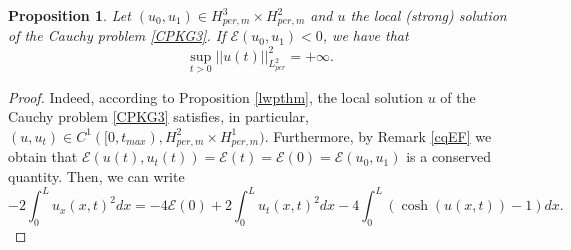 \documentclass[12pt,reqno,a4paper]{amsart} %
\numberwithin{equation}{section}
\numberwithin{figure}{section}
\newtheorem{proposition}[theorem]{Proposition}
\begin{document}
\begin{proposition}\label{bw}
Let $(u_0,u_1)\in H_{per,m}^3\times H_{per,m}^2$ and $u$ the local (strong) solution of the Cauchy problem \eqref{CPKG3}. If $\mathcal{E}(u_0,u_1)<0$, we have that $$\sup_{t>0}||u(t)||_{L_{per}^2}^2=+\infty.$$
\end{proposition}
\begin{proof}
	Indeed, according to Proposition \ref{lwpthm}, the local solution $u$ of the Cauchy problem \eqref{CPKG3} satisfies, in particular, $(u,u_t)\in C^1([0,t_{max}),H_{per,m}^2\times H_{per,m}^1)$. Furthermore, by Remark \eqref{cqEF} we obtain that $\mathcal{E}(u(t),u_t(t))= \mathcal{E}(t)=\mathcal{E}(0)=\mathcal{E}(u_0,u_1)$ is a conserved quantity. Then, we can write 
	\begin{equation}\label{blowup1}
		-2\int_0^Lu_x(x,t)^2dx=-4\mathcal{E}(0)+2\int_0^Lu_t(x,t)^2dx-4\int_0^L(\cosh(u(x,t))-1)dx.
	\end{equation}


\end{proof}
\end{document}
